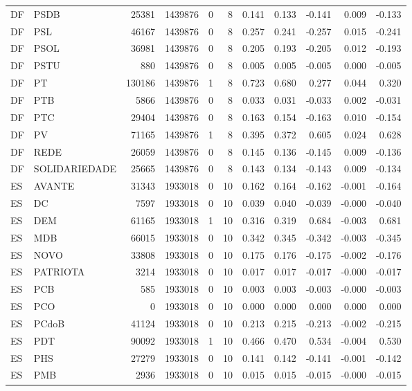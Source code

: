\begin{landscape}
\begin{longtable}{llrrrrrrrrr}
DF & PSDB & 25381 & 1439876 & 0 & 8 & 0.141 & 0.133 & -0.141 & 0.009 & -0.133 \\
DF & PSL & 46167 & 1439876 & 0 & 8 & 0.257 & 0.241 & -0.257 & 0.015 & -0.241 \\
DF & PSOL & 36981 & 1439876 & 0 & 8 & 0.205 & 0.193 & -0.205 & 0.012 & -0.193 \\
DF & PSTU & 880 & 1439876 & 0 & 8 & 0.005 & 0.005 & -0.005 & 0.000 & -0.005 \\
DF & PT & 130186 & 1439876 & 1 & 8 & 0.723 & 0.680 & 0.277 & 0.044 & 0.320 \\
DF & PTB & 5866 & 1439876 & 0 & 8 & 0.033 & 0.031 & -0.033 & 0.002 & -0.031 \\
DF & PTC & 29404 & 1439876 & 0 & 8 & 0.163 & 0.154 & -0.163 & 0.010 & -0.154 \\
DF & PV & 71165 & 1439876 & 1 & 8 & 0.395 & 0.372 & 0.605 & 0.024 & 0.628 \\
DF & REDE & 26059 & 1439876 & 0 & 8 & 0.145 & 0.136 & -0.145 & 0.009 & -0.136 \\
DF & SOLIDARIEDADE & 25665 & 1439876 & 0 & 8 & 0.143 & 0.134 & -0.143 & 0.009 & -0.134 \\
ES & AVANTE & 31343 & 1933018 & 0 & 10 & 0.162 & 0.164 & -0.162 & -0.001 & -0.164 \\
ES & DC & 7597 & 1933018 & 0 & 10 & 0.039 & 0.040 & -0.039 & -0.000 & -0.040 \\
ES & DEM & 61165 & 1933018 & 1 & 10 & 0.316 & 0.319 & 0.684 & -0.003 & 0.681 \\
ES & MDB & 66015 & 1933018 & 0 & 10 & 0.342 & 0.345 & -0.342 & -0.003 & -0.345 \\
ES & NOVO & 33808 & 1933018 & 0 & 10 & 0.175 & 0.176 & -0.175 & -0.002 & -0.176 \\
ES & PATRIOTA & 3214 & 1933018 & 0 & 10 & 0.017 & 0.017 & -0.017 & -0.000 & -0.017 \\
ES & PCB & 585 & 1933018 & 0 & 10 & 0.003 & 0.003 & -0.003 & -0.000 & -0.003 \\
ES & PCO & 0 & 1933018 & 0 & 10 & 0.000 & 0.000 & 0.000 & 0.000 & 0.000 \\
ES & PCdoB & 41124 & 1933018 & 0 & 10 & 0.213 & 0.215 & -0.213 & -0.002 & -0.215 \\
ES & PDT & 90092 & 1933018 & 1 & 10 & 0.466 & 0.470 & 0.534 & -0.004 & 0.530 \\
ES & PHS & 27279 & 1933018 & 0 & 10 & 0.141 & 0.142 & -0.141 & -0.001 & -0.142 \\
ES & PMB & 2936 & 1933018 & 0 & 10 & 0.015 & 0.015 & -0.015 & -0.000 & -0.015 \\

\end{longtable}
\end{landscape}
